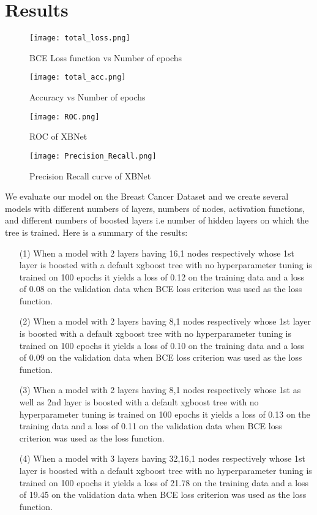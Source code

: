 \documentclass[review]{elsarticle}
\begin{document}
\section{Results}
\begin{figure*}[bt!]
\centerline{\texttt{[image: total\_loss.png]}}
\caption{BCE Loss function vs Number of epochs}    
  \label{fig:loss}
\end{figure*}

\begin{figure*}[ht!]
\centerline{\texttt{[image: total\_acc.png]}}
\caption{Accuracy vs Number of epochs}    
  \label{fig:acc}
\end{figure*}

\begin{figure*}[ht!]
\centerline{\texttt{[image: ROC.png]}}
\caption{ROC of XBNet}    
  \label{fig:acc}
\end{figure*}

\begin{figure*}[ht!]
\centerline{\texttt{[image: Precision\_Recall.png]}}
\caption{Precision Recall curve of XBNet}    
  \label{fig:acc}
\end{figure*}
We evaluate our model on the Breast Cancer Dataset and we create several models with different numbers of layers, numbers of nodes, activation functions, and different numbers of boosted layers i.e number of hidden layers on which the tree is trained. Here is a summary of the results:
\begin{enumerate}
\item[(1)] When a model with 2 layers having 16,1 nodes respectively whose 1st layer is boosted with a default xgboost tree with no hyperparameter tuning is trained on 100 epochs it yields a loss of 0.12 on the training data and a loss of 0.08 on the validation data when BCE loss criterion was used as the loss function.
\item[(2)] When a model with 2 layers having 8,1 nodes respectively whose 1st layer is boosted with a default xgboost tree with no hyperparameter tuning is trained on 100 epochs it yields a loss of 0.10 on the training data and a loss of 0.09 on the validation data when BCE loss criterion was used as the loss function.
\item[(3)] When a model with 2 layers having 8,1 nodes respectively whose 1st as well as 2nd layer is boosted with a default xgboost tree with no hyperparameter tuning is trained on 100 epochs it yields a loss of 0.13 on the training data and a loss of 0.11 on the validation data when BCE loss criterion was used as the loss function.
\item[(4)] When a model with 3 layers having 32,16,1 nodes respectively whose 1st layer is boosted with a default xgboost tree with no hyperparameter tuning is trained on 100 epochs it yields a loss of 21.78 on the training data and a loss of 19.45 on the validation data when BCE loss criterion was used as the loss function.\\

\end{enumerate}
\end{document}
